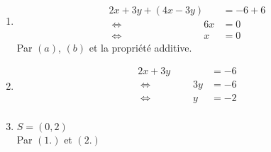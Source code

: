 \documentclass[fleqn,a4paper,nobib]{tufte-handout}
\begin{document}
\begin{enumerate}[label=\textit{Étape \arabic*.}]
    \item{
        \begin{align*}
            2x + 3y + (4x - 3y) &= -6 + 6 \tag*{$(a) + (b)$} \\
            \Leftrightarrow \qquad \qquad \qquad \qquad 6x &= 0\\
            \Leftrightarrow \qquad \qquad \qquad \qquad x &= 0
        \end{align*}
        Par $(a)$, $(b)$ et la propriété additive.}
    \item{
        \begin{align*}
            2x + 3y &= -6 \tag*{$(a)$} \\
            \Leftrightarrow \qquad \qquad 3y &= -6 \tag*{$(1)$, propriété de substitution}\\
            \Leftrightarrow \qquad \qquad y &= -2 \\
        \end{align*}}
    \item{ $S = {(0, 2)}$ \\
        Par $(1.)$ et $(2.)$}
\end{enumerate}
\end{document}
